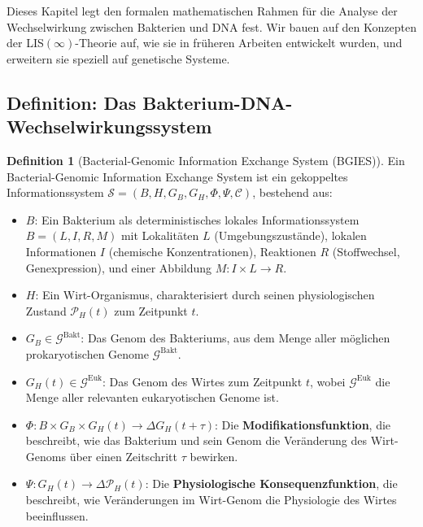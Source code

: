 \documentclass[a4paper,12pt]{article}
\theoremstyle{definition}
\newtheorem{definition}{Definition}
\begin{document}
Dieses Kapitel legt den formalen mathematischen Rahmen für die Analyse der Wechselwirkung zwischen Bakterien und DNA fest. Wir bauen auf den Konzepten der LIS$(\infty)$-Theorie auf, wie sie in früheren Arbeiten entwickelt wurden, und erweitern sie speziell auf genetische Systeme.

\subsection{Definition: Das Bakterium-DNA-Wechselwirkungssystem}

\begin{definition}[Bacterial-Genomic Information Exchange System (BGIES)]
Ein Bacterial-Genomic Information Exchange System ist ein gekoppeltes Informationssystem $\mathcal{S} = (B, H, G_B, G_H, \Phi, \Psi, \mathcal{C})$, bestehend aus:

\begin{itemize}
    \item[-] $B$: Ein Bakterium als deterministisches lokales Informationssystem $B = (L, I, R, M)$ mit Lokalitäten $L$ (Umgebungszustände), lokalen Informationen $I$ (chemische Konzentrationen), Reaktionen $R$ (Stoffwechsel, Genexpression), und einer Abbildung $M: I \times L \to R$.
    
    \item[-] $H$: Ein Wirt-Organismus, charakterisiert durch seinen physiologischen Zustand $\mathcal{P}_H(t)$ zum Zeitpunkt $t$.
    
    \item[-] $G_B \in \mathcal{G}^{\text{Bakt}}$: Das Genom des Bakteriums, aus dem Menge aller möglichen prokaryotischen Genome $\mathcal{G}^{\text{Bakt}}$.
    
    \item[-] $G_H(t) \in \mathcal{G}^{\text{Euk}}$: Das Genom des Wirtes zum Zeitpunkt $t$, wobei $\mathcal{G}^{\text{Euk}}$ die Menge aller relevanten eukaryotischen Genome ist.
    
    \item[-] $\Phi: B \times G_B \times G_H(t) \to \Delta G_H(t+\tau)$: Die \textbf{Modifikationsfunktion}, die beschreibt, wie das Bakterium und sein Genom die Veränderung des Wirt-Genoms über einen Zeitschritt $\tau$ bewirken.
    
    \item[-] $\Psi: G_H(t) \to \Delta \mathcal{P}_H(t)$: Die \textbf{Physiologische Konsequenzfunktion}, die beschreibt, wie Veränderungen im Wirt-Genom die Physiologie des Wirtes beeinflussen.
    

\end{itemize}
\end{definition}
\end{document}

